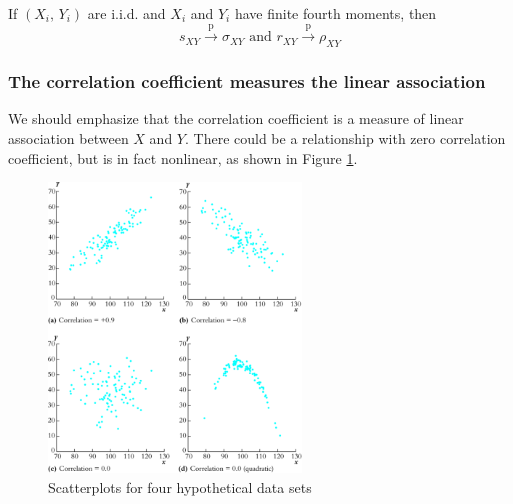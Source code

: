 \documentclass[a4paper,11pt]{article}
\begin{document}
If \((X_i,\, Y_i)\) are i.i.d. and \(X_i\) and \(Y_i\) have finite fourth
moments, then
\[ s_{XY} \xrightarrow{\text{ p }} \sigma_{XY} \text{ and } r_{XY}
\xrightarrow{\text{ p } } \rho_{XY} \]

\subsubsection*{The correlation coefficient measures the linear association}
\label{sec:org53f401f}

We should emphasize that the correlation coefficient is a measure of
linear association between \(X\) and \(Y\). There could be a relationship
with zero correlation coefficient, but is in fact nonlinear, as shown
in Figure \ref{fig:orgcbe0200}. 

\begin{figure}[htbp]
\centering
\includegraphics[width=0.6\textwidth]{figure/fig-3-3.png}
\caption{\label{fig:orgcbe0200}
Scatterplots for four hypothetical data sets}
\end{figure}
\end{document}
